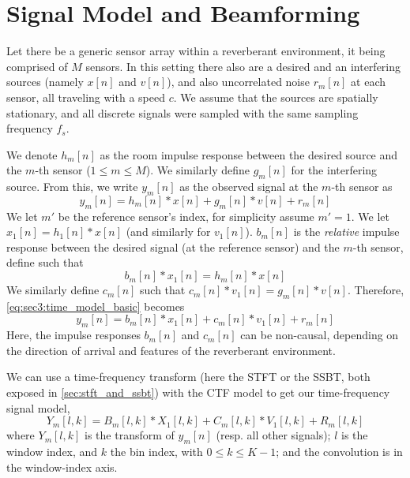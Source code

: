 \section{Signal Model and Beamforming}
\label{sec:signal_model}

Let there be a generic sensor array within a reverberant environment, it being comprised of $M$ sensors. In this setting there also are a desired and an interfering sources (namely $x[n]$ and $v[n]$), and also uncorrelated noise $r_m[n]$ at each sensor, all traveling with a speed $c$. We assume that the sources are spatially stationary, and all discrete signals were sampled with the same sampling frequency $f_s$.

We denote $h_m[n]$ as the room impulse response between the desired source and the $m$-th sensor ($1 \leq m \leq M$). We similarly define $g_m[n]$ for the interfering source. From this, we write $y_m[n]$ as the observed signal at the $m$-th sensor as
\begin{equation}
	\label{eq:sec3:time_model_basic}
	y_m[n] = h_m[n] \ast x[n] + g_m[n] \ast v[n] + r_m[n]
\end{equation}
We let $m'$ be the reference sensor's index, for simplicity assume $m'=1$. We let $x_1[n] = h_1[n] \ast x[n]$ (and similarly for $v_1[n]$). $b_m[n]$ is the \textit{relative} impulse response between the desired signal (at the reference sensor) and the $m$-th sensor, define such that
\begin{equation}
	b_m[n] \ast x_1[n] = h_m[n] \ast x[n]
\end{equation}
We similarly define $c_m[n]$ such that $c_m[n] \ast v_1[n] = g_m[n] \ast v[n]$. Therefore, \cref{eq:sec3:time_model_basic} becomes
\begin{equation}
	\label{eq:sec3:time_model_relative}
	y_m[n] = b_m[n] \ast x_1[n] + c_m[n] \ast v_1[n] + r_m[n]
\end{equation}
Here, the impulse responses $b_m[n]$ and $c_m[n]$ can be non-causal, depending on the direction of arrival and features of the reverberant environment.

We can use a time-frequency transform (here the STFT or the SSBT, both exposed in \cref{sec:stft_and_ssbt}) with the CTF model \cite{talmon_relative_2009} to get our time-frequency signal model,
\begin{equation}
	\label{eq:sec3:time-freq_model_conv}
	Y_m[l,k] = B_m[l,k] \ast X_1[l,k] + C_m[l,k] \ast V_1[l,k] + R_m[l,k]
\end{equation}
where $Y_m[l,k]$ is the transform of $y_m[n]$ (resp. all other signals); $l$ is the window index, and $k$ the bin index, with $0 \leq k \leq K-1$; and the convolution is in the window-index axis.

